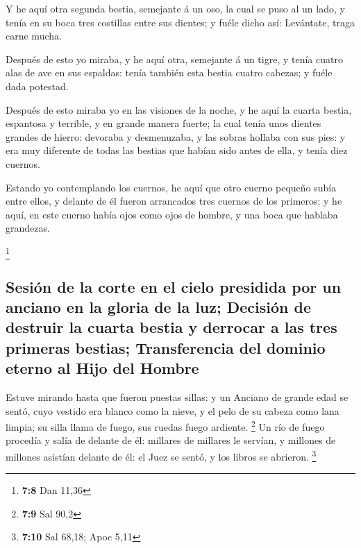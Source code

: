  Y he aquí otra segunda bestia, semejante á un oso, la cual
se puso al un lado, y tenía en su boca tres costillas entre sus dientes;
y fuéle dicho así: Levántate, traga carne mucha.

 Después de esto yo miraba, y he aquí otra, semejante á un
tigre, y tenía cuatro alas de ave en sus espaldas: tenía también esta
bestia cuatro cabezas; y fuéle dada potestad.

 Después de esto miraba yo en las visiones de la noche, y he
aquí la cuarta bestia, espantosa y terrible, y en grande manera fuerte;
la cual tenía unos dientes grandes de hierro: devoraba y desmenuzaba, y
las sobras hollaba con sus pies: y era muy diferente de todas las
bestias que habían sido antes de ella, y tenía diez cuernos.

 Estando yo contemplando los cuernos, he aquí que otro
cuerno pequeño subía entre ellos, y delante de él fueron arrancados tres
cuernos de los primeros; y he aquí, en este cuerno había ojos como ojos
de hombre, y una boca que hablaba grandezas.

\footnote{\textbf{7:8} Dan 11,36}

\hypertarget{sesiuxf3n-de-la-corte-en-el-cielo-presidida-por-un-anciano-en-la-gloria-de-la-luz-decisiuxf3n-de-destruir-la-cuarta-bestia-y-derrocar-a-las-tres-primeras-bestias-transferencia-del-dominio-eterno-al-hijo-del-hombre}{%
\subsection{Sesión de la corte en el cielo presidida por un anciano en
la gloria de la luz; Decisión de destruir la cuarta bestia y derrocar a
las tres primeras bestias; Transferencia del dominio eterno al Hijo del
Hombre}\label{sesiuxf3n-de-la-corte-en-el-cielo-presidida-por-un-anciano-en-la-gloria-de-la-luz-decisiuxf3n-de-destruir-la-cuarta-bestia-y-derrocar-a-las-tres-primeras-bestias-transferencia-del-dominio-eterno-al-hijo-del-hombre}}

 Estuve mirando hasta que fueron puestas sillas: y un
Anciano de grande edad se sentó, cuyo vestido era blanco como la nieve,
y el pelo de su cabeza como lana limpia; su silla llama de fuego, sus
ruedas fuego ardiente. \footnote{\textbf{7:9} Sal 90,2}  Un
río de fuego procedía y salía de delante de él: millares de millares le
servían, y millones de millones asistían delante de él: el Juez se
sentó, y los libros se abrieron. \footnote{\textbf{7:10} Sal 68,18; Apoc
  5,11}

